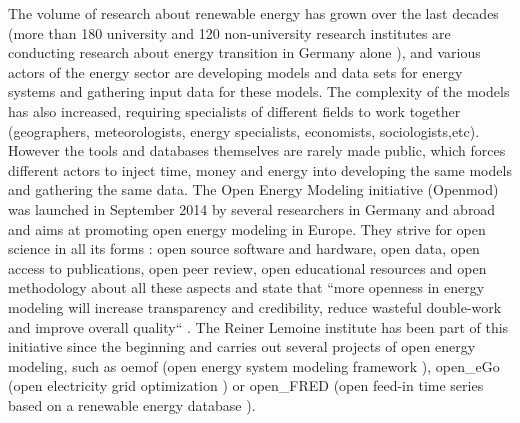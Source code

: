 The volume of research about renewable energy has grown over the last decades (more than 180 university and 120 non-university research institutes are conducting research about energy transition in Germany alone \cite{bmbf_energiewende}), and various actors of the energy sector are developing models and data sets for energy systems and gathering input data for these models. The complexity of the models has also increased, requiring specialists of different fields to work together (geographers, meteorologists, energy specialists, economists, sociologists,etc). However the tools and databases themselves are rarely made public, which forces different actors to inject time, money and energy into developing the same models and gathering the same data. \newline
The Open Energy Modeling initiative (Openmod) was launched in September 2014 by several researchers in Germany and abroad \cite{openmod_workshop} and aims at promoting open energy modeling in Europe. They strive for open science in all its forms : open source software and hardware, open data, open access to publications, open peer review, open educational resources and open methodology about all these aspects and state that ``more openness in energy modeling will increase transparency and credibility, reduce wasteful double-work and improve overall quality`` \cite{openmod_manifesto}. \newline
The Reiner Lemoine institute has been part of this initiative since the beginning and  carries out several projects of open energy modeling, such as oemof (open energy system modeling framework \cite{rli_oemof}), open\_eGo (open electricity grid optimization \cite{rli_openego}) or open\_FRED (open feed-in time series based on a renewable energy database \cite{rli_openfred}). 

